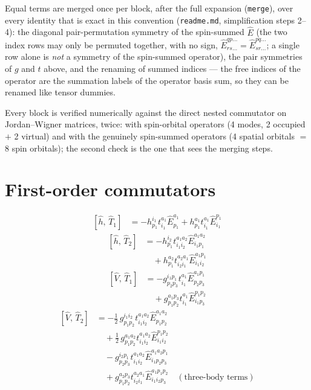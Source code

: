 \documentclass[11pt]{article}
\begin{document}
Equal terms are merged once per block, after the full expansion (\texttt{merge}), over every identity that is exact in this convention (\texttt{readme.md}, simplification steps 2--4): the diagonal pair-permutation symmetry of the spin-summed $\hat{E}$ (the two index rows may only be permuted together, with no sign, $\hat{E}^{qp\ldots}_{rs\ldots} = \hat{E}^{pq\ldots}_{sr\ldots}$; a single row alone is \emph{not} a symmetry of the spin-summed operator), the pair symmetries of $g$ and $t$ above, and the renaming of summed indices --- the free indices of the operator are the summation labels of the operator basis sum, so they can be renamed like tensor dummies.

Every block is verified numerically against the direct nested commutator on Jordan--Wigner matrices, twice: with spin-orbital operators (4 modes, 2 occupied $+$ 2 virtual) and with the genuinely spin-summed operators (4 spatial orbitals $=$ 8 spin orbitals); the second check is the one that sees the merging steps.

\section{First-order commutators}
\begin{align}
\left[\hat{h},\, \hat{T}_{1}\right] &= - h^{i_{1}}_{p_{1}} t^{a_{1}}_{i_{1}} \hat{E}^{a_{1}}_{p_{1}} + h^{a_{1}}_{p_{1}} t^{a_{1}}_{i_{1}} \hat{E}^{p_{1}}_{i_{1}}
\end{align}
\begin{align}
\left[\hat{h},\, \hat{T}_{2}\right] &= - h^{i_{2}}_{p_{1}} t^{a_{1}a_{2}}_{i_{1}i_{2}} \hat{E}^{a_{1}a_{2}}_{i_{1}p_{1}} \\
&\quad + h^{a_{2}}_{p_{1}} t^{a_{2}a_{1}}_{i_{2}i_{1}} \hat{E}^{a_{1}p_{1}}_{i_{1}i_{2}}
\end{align}
\begin{align}
\left[\hat{V},\, \hat{T}_{1}\right] &= - g^{i_{1}p_{1}}_{p_{2}p_{3}} t^{a_{1}}_{i_{1}} \hat{E}^{a_{1}p_{1}}_{p_{2}p_{3}} \\
&\quad + g^{a_{1}p_{3}}_{p_{1}p_{2}} t^{a_{1}}_{i_{1}} \hat{E}^{p_{1}p_{2}}_{i_{1}p_{3}}
\end{align}
\begin{align}
\left[\hat{V},\, \hat{T}_{2}\right] &= - \tfrac{1}{2}\, g^{i_{1}i_{2}}_{p_{1}p_{2}} t^{a_{1}a_{2}}_{i_{1}i_{2}} \hat{E}^{a_{1}a_{2}}_{p_{1}p_{2}} \\
&\quad + \tfrac{1}{2}\, g^{a_{1}a_{2}}_{p_{1}p_{2}} t^{a_{1}a_{2}}_{i_{1}i_{2}} \hat{E}^{p_{1}p_{2}}_{i_{1}i_{2}} \\
&\quad - g^{i_{2}p_{1}}_{p_{2}p_{3}} t^{a_{1}a_{2}}_{i_{1}i_{2}} \hat{E}^{a_{1}a_{2}p_{1}}_{i_{1}p_{2}p_{3}} \\
&\quad + g^{a_{2}p_{3}}_{p_{1}p_{2}} t^{a_{2}a_{1}}_{i_{2}i_{1}} \hat{E}^{a_{1}p_{1}p_{2}}_{i_{1}i_{2}p_{3}}\quad (\text{three-body terms})
\end{align}
\end{document}
